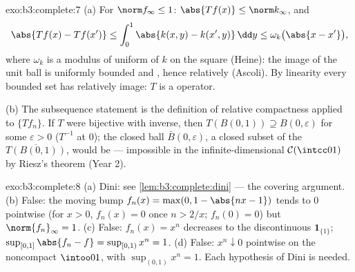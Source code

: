 \begin{solution}{exo:b3:complete:7}
(a) For $\norm f_\infty \leq 1$: $\abs{Tf(x)} \leq
\norm k_\infty$, and
\[
\abs{Tf(x) - Tf(x')} \leq \int_0^1\abs{k(x,y) -
k(x',y)}\,\dd y \leq \omega_k\bigl(\abs{x - x'}\bigr),
\]
where $\omega_k$ is a modulus of uniform  of $k$ on
the  square (Heine): the image of the unit ball is
uniformly bounded and , hence relatively 
(Ascoli). By linearity every bounded set has relatively 
image: $T$ is a  operator.

(b) The subsequence statement is the definition of relative
compactness applied to $\{Tf_n\}$. If $T$ were bijective with
 inverse, then $T(B(0,1)) \supseteq B(0,
\varepsilon)$ for some $\varepsilon > 0$ ($T^{-1}$ 
at $0$); the closed ball $\bar B(0,\varepsilon)$, a closed
subset of the  $\overline{T(B(0,1))}$, would be 
--- impossible in the infinite-dimensional $\mathcal
C(\intcc01)$ by Riesz's theorem (Year 2).
\end{solution}

\begin{solution}{exo:b3:complete:8}
(a) Dini: see \cref{lem:b3:complete:dini} --- the covering
argument. (b) False: the moving bump $f_n(x) = \max(0, 1 -
\abs{nx - 1})$ tends to $0$ pointwise (for $x > 0$, $f_n(x) =
0$ once $n > 2/x$; $f_n(0) = 0$) but $\norm{f_n}_\infty = 1$.
(c) False: $f_n(x) = x^n$ decreases to the discontinuous
$\mathbf 1_{\{1\}}$; $\sup_{[0,1]}\abs{f_n - f} = \sup_{[0,1)}
x^n = 1$. (d) False: $x^n \downarrow 0$ pointwise on the
noncompact $\intoo01$, with $\sup_{(0,1)}x^n = 1$. Each
hypothesis of Dini is needed.
\end{solution}

